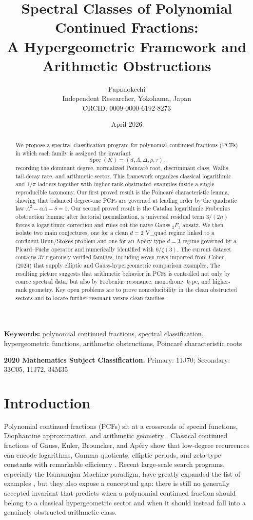 \documentclass[11pt]{article}
\title{Spectral Classes of Polynomial Continued Fractions:\\A Hypergeometric Framework and Arithmetic Obstructions}
\author{Papanokechi\\
\small Independent Researcher, Yokohama, Japan\\
\small ORCID: 0009-0000-6192-8273}
\date{April 2026}
\begin{document}
\maketitle

\begin{abstract}
We propose a spectral classification program for polynomial continued fractions (PCFs) in which each family is assigned the invariant
\[
\operatorname{Spec}(K)=(d,\Lambda,\Delta,\rho,\tau),
\]
recording the dominant degree, normalized Poincar\'e root, discriminant class, Wallis tail-decay rate, and arithmetic sector. This framework organizes classical logarithmic and $1/\pi$ ladders together with higher-rank obstructed examples inside a single reproducible taxonomy. Our first proved result is the Poincar\'e characteristic lemma, showing that balanced degree-one PCFs are governed at leading order by the quadratic law $\Lambda^2-\alpha\Lambda-\delta=0$. Our second proved result is the Catalan logarithmic Frobenius obstruction lemma: after factorial normalization, a universal residual term $3/(2n)$ forces a logarithmic correction and rules out the naive Gauss ${}_2F_1$ ansatz. We then isolate two main conjectures, one for a clean $d=2$ V\_quad regime linked to a confluent-Heun/Stokes problem and one for an Ap\'ery-type $d=3$ regime governed by a Picard--Fuchs operator and numerically identified with $6/\zeta(3)$. The current dataset contains 37 rigorously verified families, including seven rows imported from Cohen (2024) that supply elliptic and Gauss-hypergeometric comparison examples. The resulting picture suggests that arithmetic behavior in PCFs is controlled not only by coarse spectral data, but also by Frobenius resonance, monodromy type, and higher-rank geometry. Key open problems are to prove nonreducibility in the clean obstructed sectors and to locate further resonant-versus-clean families.
\end{abstract}

\noindent\textbf{Keywords:} polynomial continued fractions, spectral classification, hypergeometric functions, arithmetic obstructions, Poincar\'e characteristic roots

\noindent\textbf{2020 Mathematics Subject Classification.}
Primary: 11J70;
Secondary: 33C05, 11J72, 34M35

\section{Introduction}
Polynomial continued fractions (PCFs) sit at a crossroads of special functions, Diophantine approximation, and arithmetic geometry \cite{wall1948,lorentzen2008}. Classical continued fractions of Gauss, Euler, Brouncker, and Ap\'ery show that low-degree recurrences can encode logarithms, Gamma quotients, elliptic periods, and zeta-type constants with remarkable efficiency \cite{apery1979}. Recent large-scale search programs, especially the Ramanujan Machine paradigm, have greatly expanded the list of examples \cite{raayoni2021}, but they also expose a conceptual gap: there is still no generally accepted invariant that predicts when a polynomial continued fraction should belong to a classical hypergeometric sector and when it should instead fall into a genuinely obstructed arithmetic class.
\end{document}
